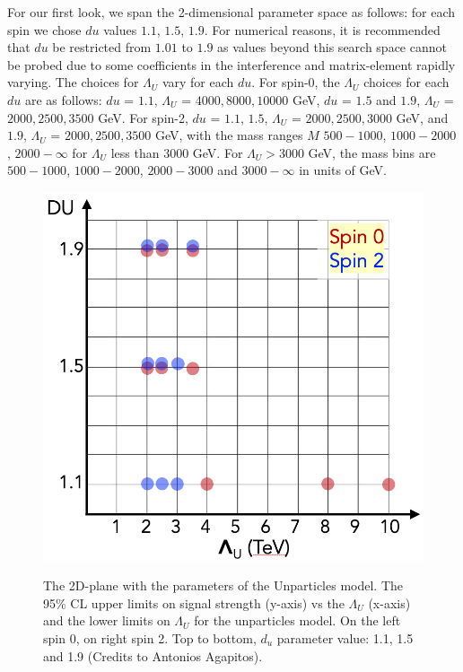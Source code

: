For our first look, we span the 2-dimensional parameter space as follows: for each spin we chose $du$ values $1.1$, $1.5$, $1.9$. For numerical reasons\cite{KumarEtal:2008}, it is recommended that $du$ be restricted from $1.01$ to $1.9$ as values beyond this search space cannot be probed due to some coefficients in the interference and matrix-element rapidly varying. The choices for $\Lambda_U$ vary for each $du$. For spin-0, the $\Lambda_U$ choices for each $du$ are as follows: $du$ = $1.1$, $\Lambda_U$ = $4000, 8000, 10000$ GeV, $du$ = $1.5$ and $1.9$, $\Lambda_U$ = $2000, 2500, 3500$ GeV. For spin-2, $du$ = $1.1$, $1.5$, $\Lambda_U$ = $2000, 2500, 3000$ GeV, and $1.9$, $\Lambda_U$ = $2000, 2500, 3500$ GeV, with the mass ranges $M$ $500-1000$, $1000-2000$, $2000-\infty$ for $\Lambda_U$ less than $3000$ GeV. For $\Lambda_U > 3000$ GeV, the mass bins are $500-1000$, $1000-2000$, $2000-3000$ and $3000-\infty$ in units of GeV.

\begin{figure}[!htbp]
	\caption{The 2D-plane with the parameters of the Unparticles model.
The 95\% CL upper limits on signal strength (y-axis) vs the $\Lambda_U$ (x-axis) and the lower limits on $\Lambda_U$ for the unparticles model.
On the left spin 0, on right spin 2. Top to bottom, $d_{u}$ parameter value: 1.1, 1.5 and 1.9 (Credits to Antonios Agapitos).}
	\centering
    \includegraphics[scale=0.3]{fig/Unpar_plane.png}
	\label{fig:UnparticlesSearchSpace}
\end{figure}

